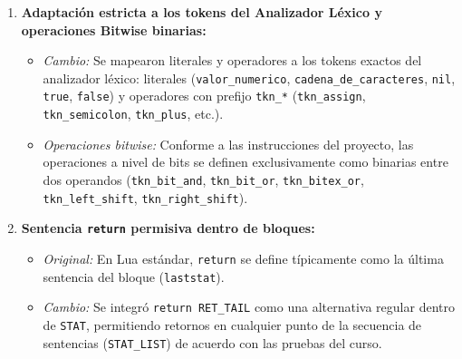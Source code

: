 \documentclass[10pt,letterpaper]{article}
\begin{document}
\begin{enumerate}
  \item \textbf{Adaptación estricta a los tokens del Analizador Léxico y operaciones Bitwise binarias:}
  \begin{itemize}
    \item \textit{Cambio:} Se mapearon literales y operadores a los tokens exactos del analizador léxico: literales (\texttt{valor\_numerico}, \texttt{cadena\_de\_\allowbreak caracteres}, \texttt{nil}, \texttt{true}, \texttt{false}) y operadores con prefijo \texttt{tkn\_*} (\texttt{tkn\_assign}, \texttt{tkn\_semicolon}, \texttt{tkn\_plus}, etc.).
    \item \textit{Operaciones bitwise:} Conforme a las instrucciones del proyecto, las operaciones a nivel de bits se definen exclusivamente como binarias entre dos operandos (\texttt{tkn\_bit\_and}, \texttt{tkn\_bit\_or}, \texttt{tkn\_bitex\_or}, \texttt{tkn\_left\_shift}, \texttt{tkn\_right\_shift}).
  \end{itemize}

  \item \textbf{Sentencia \texttt{return} permisiva dentro de bloques:}
  \begin{itemize}
    \item \textit{Original:} En Lua estándar, \texttt{return} se define típicamente como la última sentencia del bloque (\texttt{laststat}).
    \item \textit{Cambio:} Se integró \texttt{return RET\_TAIL} como una alternativa regular dentro de \texttt{STAT}, permitiendo retornos en cualquier punto de la secuencia de sentencias (\texttt{STAT\_LIST}) de acuerdo con las pruebas del curso.
  \end{itemize}
\end{enumerate}
\end{document}
